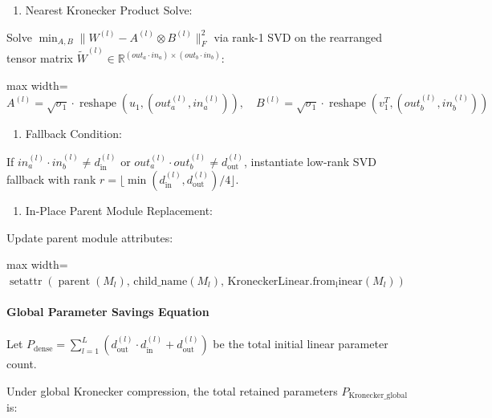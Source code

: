 \begin{enumerate}
\item Nearest Kronecker Product Solve:
\end{enumerate}
Solve $\min_{A, B} \|W^{(l)} - A^{(l)} \otimes B^{(l)}\|_F^2$ via rank-1 SVD on the rearranged tensor matrix $\widetilde{W}^{(l)} \in \mathbb{R}^{(out_a \cdot in_a) \times (out_b \cdot in_b)}$:

\begin{center}
\begin{adjustbox}{max width=\columnwidth}
$\displaystyle
A^{(l)} = \sqrt{\sigma_1} \cdot \operatorname{reshape}(u_1, (out_a^{(l)}, in_a^{(l)})), \quad B^{(l)} = \sqrt{\sigma_1} \cdot \operatorname{reshape}(v_1^T, (out_b^{(l)}, in_b^{(l)}))
$
\end{adjustbox}
\end{center}

\begin{enumerate}
\item Fallback Condition:
\end{enumerate}
If $in_a^{(l)} \cdot in_b^{(l)} \ne d_{\text{in}}^{(l)}$ or $out_a^{(l)} \cdot out_b^{(l)} \ne d_{\text{out}}^{(l)}$, instantiate low-rank SVD fallback with rank $r = \lfloor \min(d_{\text{in}}^{(l)}, d_{\text{out}}^{(l)}) / 4 \rfloor$.

\begin{enumerate}
\item In-Place Parent Module Replacement:
\end{enumerate}
Update parent module attributes:

\begin{center}
\begin{adjustbox}{max width=\columnwidth}
$\displaystyle
\operatorname{setattr}\left( \operatorname{parent}(M_l), \, \text{child\_name}(M_l), \, \operatorname{KroneckerLinear.from_linear}(M_l) \right)
$
\end{adjustbox}
\end{center}

\paragraph{Global Parameter Savings Equation}
Let $P_{\text{dense}} = \sum_{l=1}^L (d_{\text{out}}^{(l)} \cdot d_{\text{in}}^{(l)} + d_{\text{out}}^{(l)})$ be the total initial linear parameter count.

Under global Kronecker compression, the total retained parameters $P_{\text{Kronecker\_global}}$ is:

